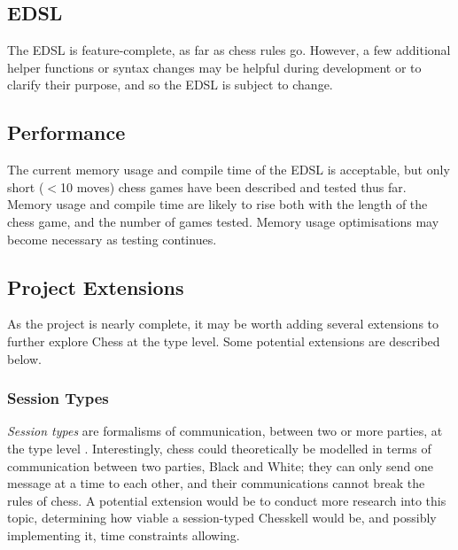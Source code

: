 \documentclass[12pt, a4paper, bibliography=totocnumbered]{scrartcl}
\begin{document}

\subsection{EDSL}

The EDSL is feature-complete, as far as chess rules go. However, a few additional helper functions or syntax changes may be helpful during development or to clarify their purpose, and so the EDSL is subject to change.

\subsection{Performance}

The current memory usage and compile time of the EDSL is acceptable, but only short ($<$10 moves) chess games have been described and tested thus far. Memory usage and compile time are likely to rise both with the length of the chess game, and the number of games tested. Memory usage optimisations may become necessary as testing continues.

\subsection{Project Extensions}

As the project is nearly complete, it may be worth adding several extensions to further explore Chess at the type level. Some potential extensions are described below.

\subsubsection{Session Types}

\emph{Session types} are formalisms of communication, between two or more parties, at the type level \cite{torinosessions}. Interestingly, chess could theoretically be modelled in terms of communication between two parties, Black and White; they can only send one message at a time to each other, and their communications cannot break the rules of chess. A potential extension would be to conduct more research into this topic, determining how viable a session-typed Chesskell would be, and possibly implementing it, time constraints allowing.
\end{document}

